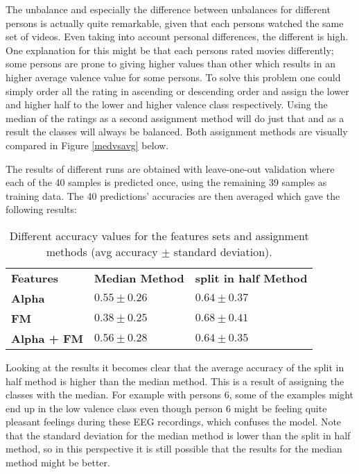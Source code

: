 The unbalance and especially the difference between unbalances for different persons is actually quite remarkable, given that each persons watched the same set of videos. Even taking into account personal differences, the different is high. One explanation for this might be that each persons rated movies differently; some persons are prone to giving higher values than other which results in an higher average valence value for some persons. To solve this problem one could simply order all the rating in ascending or descending order and assign the lower and higher half to the lower and higher valence class respectively. Using the median of the ratings as a second assignment method will do just that and as a result the classes will always be balanced. Both assignment methods are visually compared in Figure \ref{medvsavg} below.


\clearpage

The results of different runs are obtained with leave-one-out validation where each of the 40 samples is predicted once, using the remaining 39 samples as training data. The 40 predictions' accuracies are then averaged which gave the following results:


\begin{table}[H]
\centering
\begin{tabular}{lll}
\textbf{Features} & \textbf{Median Method} & \textbf{split in half Method} \\
\textbf{Alpha}             & $0.55 \pm 0.26$   & $0.64 \pm 0.37$     \\
\textbf{FM}                & $0.38 \pm 0.25$   & $0.68 \pm 0.41$    \\
\textbf{Alpha + FM}        & $0.56 \pm 0.28$   & $0.64 \pm 0.35$   
\end{tabular}
\caption{Different accuracy values for the features sets and assignment methods (avg accuracy $\pm$ standard deviation).}
\label{firstrestable}
\end{table}

Looking at the results it becomes clear that the average accuracy of the split in half method is higher than the median method. This is a result of assigning the classes with the median. For example with persons 6, some of the examples might end up in the low valence class even though person 6 might be feeling quite pleasant feelings during these EEG recordings, which confuses the model. 
Note that the standard deviation for the median method is lower than the split in half method, so in this perspective it is still possible that the results for the median method might be better. 

